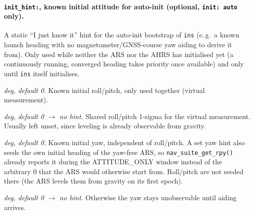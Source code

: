 \documentclass[11pt,a4paper]{article}
\newcommand{\code}[1]{\texttt{#1}}
\begin{document}
\paragraph{\code{init\_\allowbreak{}hint:}, known initial attitude for auto-init (optional, \code{init: auto} only).}
A static ``I just know it'' hint for the auto-init bootstrap of \code{ins} (e.\,g.\ a
known launch heading with no magnetometer/GNSS-course yaw aiding to derive it
from). Only used while neither the ARS nor the AHRS has initialised yet (a
continuously running, converged heading takes priority once available) and only
until \code{ins} itself initialises.
\begin{description}\setlength\itemsep{0pt}
  \item[\code{roll\_\allowbreak{}deg}, \code{pitch\_\allowbreak{}deg}] \emph{deg, default 0.} Known initial
      roll/pitch, only used together (virtual measurement).
  \item[\code{rpy\_\allowbreak{}stddev\_\allowbreak{}deg}] \emph{deg, default 0 $\to$ no hint.} Shared
    roll/pitch 1-sigma for the virtual measurement. Usually left unset, since
    leveling is already observable from gravity.
  \item[\code{yaw\_\allowbreak{}deg}] \emph{deg, default 0.} Known initial yaw, independent
    of roll/pitch. A set yaw hint also seeds the own initial heading of the
    yaw-free ARS, so \code{nav\_\allowbreak{}suite\_\allowbreak{}get\_\allowbreak{}rpy()} already reports it during the
    ATTITUDE\_ONLY window instead of the arbitrary 0 that the ARS would otherwise
    start from. Roll/pitch are not seeded there (the ARS levels them from
    gravity on its first epoch).
  \item[\code{yaw\_\allowbreak{}stddev\_\allowbreak{}deg}] \emph{deg, default 0 $\to$ no hint.} Otherwise the
    yaw stays unobservable until aiding arrives.
\end{description}
\end{document}
